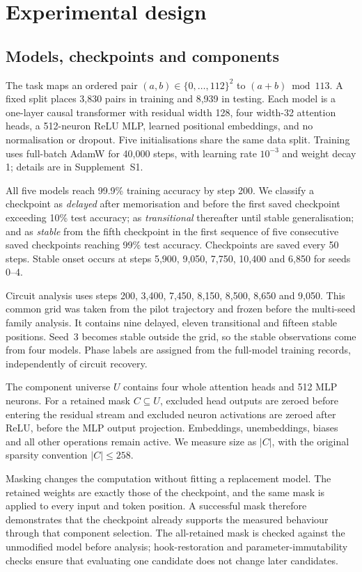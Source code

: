 \section{Experimental design}
\label{sec:methods}

\subsection{Models, checkpoints and components}

The task maps an ordered pair $(a,b)\in\{0,\ldots,112\}^2$ to $(a+b)\bmod113$. A fixed split places 3,830 pairs in training and 8,939 in testing. Each model is a one-layer causal transformer with residual width 128, four width-32 attention heads, a 512-neuron ReLU MLP, learned positional embeddings, and no normalisation or dropout. Five initialisations share the same data split. Training uses full-batch AdamW for 40,000 steps, with learning rate $10^{-3}$ and weight decay 1; details are in Supplement~S1.

All five models reach 99.9\% training accuracy by step 200. We classify a checkpoint as \emph{delayed} after memorisation and before the first saved checkpoint exceeding 10\% test accuracy; as \emph{transitional} thereafter until stable generalisation; and as \emph{stable} from the fifth checkpoint in the first sequence of five consecutive saved checkpoints reaching 99\% test accuracy. Checkpoints are saved every 50 steps. Stable onset occurs at steps 5,900, 9,050, 7,750, 10,400 and 6,850 for seeds 0--4.

Circuit analysis uses steps 200, 3,400, 7,450, 8,150, 8,500, 8,650 and 9,050. This common grid was taken from the pilot trajectory and frozen before the multi-seed family analysis. It contains nine delayed, eleven transitional and fifteen stable positions. Seed~3 becomes stable outside the grid, so the stable observations come from four models. Phase labels are assigned from the full-model training records, independently of circuit recovery.

The component universe $U$ contains four whole attention heads and 512 MLP neurons. For a retained mask $C\subseteq U$, excluded head outputs are zeroed before entering the residual stream and excluded neuron activations are zeroed after ReLU, before the MLP output projection. Embeddings, unembeddings, biases and all other operations remain active. We measure size as $|C|$, with the original sparsity convention $|C|\leq258$.

Masking changes the computation without fitting a replacement model. The retained weights are exactly those of the checkpoint, and the same mask is applied to every input and token position. A successful mask therefore demonstrates that the checkpoint already supports the measured behaviour through that component selection. The all-retained mask is checked against the unmodified model before analysis; hook-restoration and parameter-immutability checks ensure that evaluating one candidate does not change later candidates.

